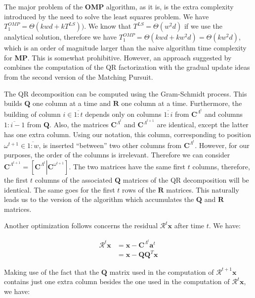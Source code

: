 \documentclass[12pt,a4paper,oneside,english]{UPBThesis}
\newcommand{\hcrange}[2]{\overline{{#1}\colon\!\!{#2}}}
\begin{document}
The major problem of the \textbf{OMP} algorithm, as it is, is the extra complexity introduced by the need to solve the least squares problem. We have $T_1^{OMP} = \Theta(kwd + kT^{LS}))$. We know that $T^{LS} = \Theta(w^2d)$ if we use the analytical solution, therefore we have $T_1^{OMP} = \Theta(kwd + kw^2d) = \Theta(kw^2d)$, which is an order of magnitude larger than the naive algorithm time complexity for \textbf{MP}. This is somewhat prohibitive. However, an approach suggested by \cite{matchingpursuit2,pursuitdifferences} combines the computation of the QR factorization with the gradual update ideas from the second version of the Matching Pursuit.

The QR decomposition can be computed using the Gram-Schmidt process. This builds $\textbf{Q}$ one column at a time and $\textbf{R}$ one column at a time. Furthermore, the building of column $i \in \hcrange{1}{t}$ depends only on columns $\hcrange{1}{i}$ from $\textbf{C}^{\Lambda^t}$ and columns $\hcrange{1}{i-1}$ from $\textbf{Q}$. Also, the matrices $\textbf{C}^{\Lambda^t}$ and $\textbf{C}^{\Lambda^{t+1}}$ are identical, except the latter has one extra column. Using our notation, this column, corresponding to position $\omega^{t+1} \in \hcrange{1}{w}$, is inserted ``between'' two other columns from $\textbf{C}^{\Lambda^t}$. However, for our purposes, the order of the columns is irrelevant. Therefore we can consider $\textbf{C}^{\Lambda^{t+1}} = \left[\textbf{C}^{\Lambda^t} \left|\right. \textbf{C}^{\omega^{t+1}} \right]$. The two matrices have the same first $t$ columns, therefore, the first $t$ columns of the associated $\textbf{Q}$ matrices of the QR decomposition will be identical. The same goes for the first $t$ rows of the $\textbf{R}$ matrices. This naturally leads us to the version of the algorithm which accumulates the $\textbf{Q}$ and $\textbf{R}$ matrices.

Another optimization follows concerns the residual $\mathcal{R}^t\textbf{x}$ after time $t$. We have:

\begin{align*}
\mathcal{R}^t\textbf{x} & = \textbf{x} - \textbf{C}^{\Lambda^t}\textbf{a}^t \\
& = \textbf{x} - \textbf{Q}\textbf{Q}^T\textbf{x}
\end{align*}

Making use of the fact that the $\textbf{Q}$ matrix used in the computation of $\mathcal{R}^{t+1}\textbf{x}$ contains just one extra column besides the one used in the computation of $\mathcal{R}^t\textbf{x}$, we have:
\end{document}
